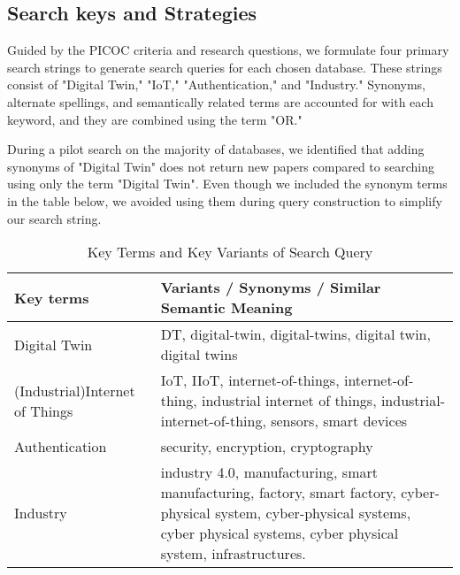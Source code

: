 \subsection{Search keys and Strategies}
Guided by the PICOC criteria and research questions, we formulate four primary search strings to generate search queries for each chosen database. These strings consist of "Digital Twin," "IoT," "Authentication," and "Industry." Synonyms, alternate spellings, and semantically related terms are accounted for with each keyword, and they are combined using the term "OR."

During a pilot search on the majority of databases, we identified that adding synonyms of "Digital Twin" does not return new papers compared to searching using only the term "Digital Twin". Even though we included the synonym terms in the table below, we avoided using them during query construction to simplify our search string.

\begin{table}[h]
\caption{ Key Terms and Key Variants of Search Query}
\begin{NiceTabular}{p{3.2cm}p{11cm}}
\toprule
    \textbf{Key terms} & \textbf{Variants / Synonyms / Similar Semantic Meaning} \\
    \midrule
    Digital Twin & DT, digital-twin, digital-twins, digital twin, digital twins \\ \hline
    (Industrial)Internet of Things & IoT, IIoT, internet-of-things, internet-of-thing, industrial internet of things, industrial-internet-of-thing, sensors, smart devices  \\ \hline
    Authentication & security, encryption, cryptography\\ \hline
    Industry & industry 4.0, manufacturing, smart manufacturing, factory, smart factory, cyber-physical system, cyber-physical systems, cyber physical systems, cyber physical system, infrastructures. \\ 
\bottomrule
\end{NiceTabular}
\end{table}
